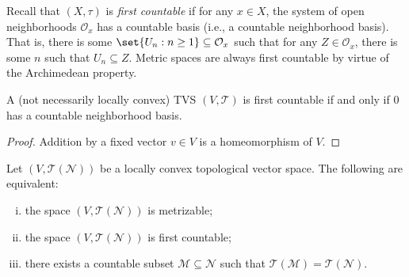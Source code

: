 \documentclass[10pt]{mypackage}
\begin{document}
Recall that $\left( X,\tau \right)$ is \textit{first countable} if for any $x\in X$, the system of open neighborhoods $\mathcal{O}_{x}$ has a countable basis (i.e., a countable neighborhood basis). That is, there is some $\set{U_n : n\geq 1}\subseteq \mathcal{O}_x$ such that for any $Z\in \mathcal{O}_x$, there is some $n$ such that $U_n \subseteq Z$. Metric spaces are always first countable by virtue of the Archimedean property.
\begin{proposition}
  A (not necessarily locally convex) TVS $\left( V,\mathcal{T} \right)$ is first countable if and only if $0$ has a countable neighborhood basis.
\end{proposition}
\begin{proof}
  Addition by a fixed vector $v\in V$ is a homeomorphism of $V$.
\end{proof}
\begin{theorem}
  Let $\left( V,\mathcal{T}\left( \mathcal{N} \right) \right)$ be a locally convex topological vector space. The following are equivalent:
  \begin{enumerate}[(i)]
    \item the space $\left( V,\mathcal{T}\left( \mathcal{N} \right) \right)$ is metrizable;
    \item the space $\left( V,\mathcal{T}\left( \mathcal{N} \right) \right)$ is first countable;
    \item there exists a countable subset $\mathcal{M}\subseteq \mathcal{N}$ such that $\mathcal{T}\left( \mathcal{M} \right) = \mathcal{T}\left( \mathcal{N} \right)$.
  \end{enumerate}
\end{theorem}
\end{document}
